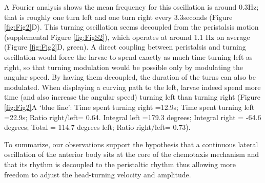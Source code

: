 \documentclass[10pt,a4paper]{article}
\begin{document}
A Fourier analysis shows the mean frequency for this oscillation is around 0.3Hz; that is roughly one turn left and one turn right every 3.3seconds (Figure \ref{fig:Fig2}D). This turning oscillation seems decoupled from the peristalsis motion (supplemental Figure \ref{fig:FigS2}), which operates at around 1.1 Hz on average (Figure \ref{fig:Fig2}D, green). A direct coupling between peristalsis and turning oscillation would force the larvae to spend exactly as much time turning left as right, so that turning modulation would be possible only by modulating the angular speed. By having them decoupled, the duration of the turns can also be modulated. When displaying a curving path to the left, larvae indeed spend more time (and also increase the angular speed) turning left than turning right (Figure \ref{fig:Fig2}A ‘blue line’:  Time spent turning right =12.9s; Time spent turning left =22.9s; Ratio right/left= 0.64. Integral left =179.3 degrees; Integral right = -64.6 degrees; Total = 114.7 degrees left; Ratio right/left= 0.73).

To summarize, our observations support the hypothesis that a continuous lateral oscillation of the anterior body sits at the core of the chemotaxis mechanism and that its rhythm is decoupled to the peristaltic rhythm thus allowing more freedom to adjust the head-turning velocity and amplitude.
\end{document}
